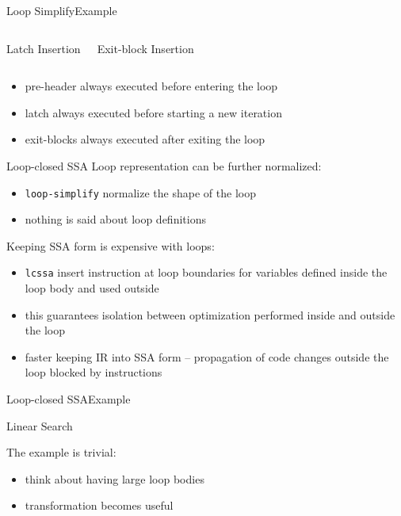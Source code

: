 \documentclass[10pt,mathserif]{beamer}
\begin{document}
\begin{frame}{Loop Simplify}{Example}
\begin{columns}[t]
\begin{block}{Latch Insertion}
\centering

\end{block}

\begin{block}{Exit-block Insertion}
\centering

\end{block}
\end{columns}

\begin{itemize}
\item pre-header always executed before entering the loop
\item latch always executed before starting a new iteration
\item exit-blocks always executed after exiting the loop
\end{itemize}
\end{frame}

\begin{frame}{Loop-closed SSA}
Loop representation can be further normalized:

\begin{itemize}
\item \texttt{loop-simplify} normalize the \alert{shape} of the loop
\item nothing is said about loop definitions
\end{itemize}

\vfill
Keeping SSA form is expensive with loops:

\begin{itemize}
\item \texttt{lcssa} insert  instruction at loop boundaries for
      variables \alert{defined inside} the loop body and \alert{used outside}
\item this guarantees isolation between optimization performed inside and outside
      the loop
\item faster keeping IR into SSA form -- propagation of code changes outside the
      loop blocked by  instructions
\end{itemize}
\end{frame}

\begin{frame}{Loop-closed SSA}{Example}
\begin{block}{Linear Search}
\centering
{}
\end{block}

\vfill
The example is trivial:

\begin{itemize}
\item think about having large loop bodies
\item transformation becomes useful
\end{itemize}
\end{frame}
\end{document}
